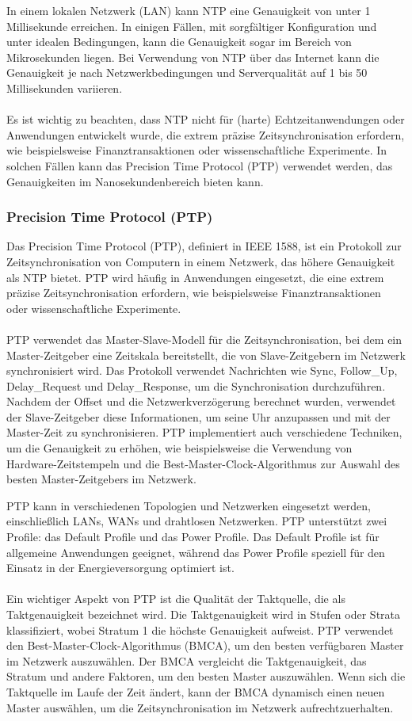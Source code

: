 \documentclass[../vs-script-first-v01.tex]{subfiles}
\begin{document}
In einem lokalen Netzwerk (LAN) kann NTP eine Genauigkeit von unter 1 Millisekunde erreichen. In einigen Fällen, mit sorgfältiger Konfiguration und unter idealen Bedingungen, kann die Genauigkeit sogar im Bereich von Mikrosekunden liegen. Bei Verwendung von NTP über das Internet kann die Genauigkeit je nach Netzwerkbedingungen und Serverqualität auf 1 bis 50 Millisekunden variieren.
\\\\
Es ist wichtig zu beachten, dass NTP nicht für (harte) Echtzeitanwendungen oder Anwendungen entwickelt wurde, die extrem präzise Zeitsynchronisation erfordern, wie beispielsweise Finanztransaktionen oder wissenschaftliche Experimente. In solchen Fällen kann das Precision Time Protocol (PTP) verwendet werden, das Genauigkeiten im Nanosekundenbereich bieten kann.

\subsubsection{Precision Time Protocol (PTP)}

Das Precision Time Protocol (PTP), definiert in IEEE 1588, ist ein Protokoll zur Zeitsynchronisation von Computern in einem Netzwerk, das höhere Genauigkeit als NTP bietet. PTP wird häufig in Anwendungen eingesetzt, die eine extrem präzise Zeitsynchronisation erfordern, wie beispielsweise Finanztransaktionen oder wissenschaftliche Experimente.
\\\\
PTP verwendet das Master-Slave-Modell für die Zeitsynchronisation, bei dem ein Master-Zeitgeber eine Zeitskala bereitstellt, die von Slave-Zeitgebern im Netzwerk synchronisiert wird. Das Protokoll verwendet Nachrichten wie Sync, Follow\_Up, Delay\_Request und Delay\_Response, um die Synchronisation durchzuführen.
Nachdem der Offset und die Netzwerkverzögerung berechnet wurden, verwendet der Slave-Zeitgeber diese Informationen, um seine Uhr anzupassen und mit der Master-Zeit zu synchronisieren. PTP implementiert auch verschiedene Techniken, um die Genauigkeit zu erhöhen, wie beispielsweise die Verwendung von Hardware-Zeitstempeln und die Best-Master-Clock-Algorithmus zur Auswahl des besten Master-Zeitgebers im Netzwerk.

PTP kann in verschiedenen Topologien und Netzwerken eingesetzt werden, einschließlich LANs, WANs und drahtlosen Netzwerken. PTP unterstützt zwei Profile: das Default Profile und das Power Profile. Das Default Profile ist für allgemeine Anwendungen geeignet, während das Power Profile speziell für den Einsatz in der Energieversorgung optimiert ist.
\\\\
Ein wichtiger Aspekt von PTP ist die Qualität der Taktquelle, die als Taktgenauigkeit bezeichnet wird. Die Taktgenauigkeit wird in Stufen oder Strata klassifiziert, wobei Stratum 1 die höchste Genauigkeit aufweist. PTP verwendet den Best-Master-Clock-Algorithmus (BMCA), um den besten verfügbaren Master im Netzwerk auszuwählen. Der BMCA vergleicht die Taktgenauigkeit, das Stratum und andere Faktoren, um den besten Master auszuwählen. Wenn sich die Taktquelle im Laufe der Zeit ändert, kann der BMCA dynamisch einen neuen Master auswählen, um die Zeitsynchronisation im Netzwerk aufrechtzuerhalten.
\end{document}
